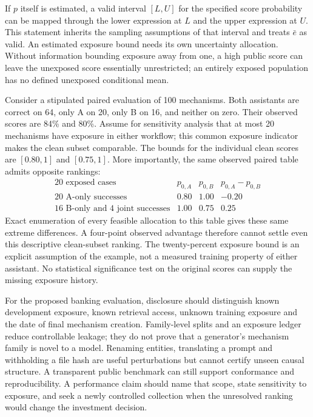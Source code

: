 If \(p\) itself is estimated, a valid interval \([L,U]\) for
the specified score probability can be mapped through the lower expression
at \(L\) and the upper expression at \(U\). This statement inherits the
sampling assumptions of that interval and treats \(\bar e\) as valid. An
estimated exposure bound needs its own uncertainty allocation. Without
information bounding exposure away from one, a high public score can leave
the unexposed score essentially unrestricted; an entirely exposed population
has no defined unexposed conditional mean.

Consider a stipulated paired evaluation of 100 mechanisms. Both assistants
are correct on 64, only A on 20, only B on 16, and neither on zero. Their
observed scores are 84\% and 80\%. Assume for sensitivity analysis that at
most 20 mechanisms have exposure in either workflow; this common exposure
indicator makes the clean subset comparable. The bounds for the individual
clean scores are \([0.80,1]\) and \([0.75,1]\). More importantly, the same
observed paired table admits opposite rankings:
\[
 \begin{array}{c|cc|c}
 \text{20 exposed cases} & p_{0,A}&p_{0,B}&p_{0,A}-p_{0,B}\\
 \hline
 \text{20 A-only successes}&0.80&1.00&-0.20\\
 \text{16 B-only and 4 joint successes}&1.00&0.75&0.25
 \end{array}
\]
Exact enumeration of every feasible allocation to this table gives these
same extreme differences. A four-point observed advantage therefore cannot
settle even this descriptive clean-subset ranking. The twenty-percent
exposure bound is an explicit assumption of the example, not a measured
training property of either assistant. No statistical significance test on
the original scores can supply the missing exposure history.
\citep{exec14_l7_exact}

For the proposed banking evaluation, disclosure should distinguish known
development exposure, known retrieval access, unknown training exposure and
the date of final mechanism creation. Family-level splits and an exposure
ledger reduce controllable leakage; they do not prove that a generator's
mechanism family is novel to a model. Renaming entities, translating a prompt
and withholding a file hash are useful perturbations but cannot certify
unseen causal structure. A transparent public benchmark can still support
conformance and reproducibility. A performance claim should name that scope,
state sensitivity to exposure, and seek a newly controlled collection when
the unresolved ranking would change the investment decision.

